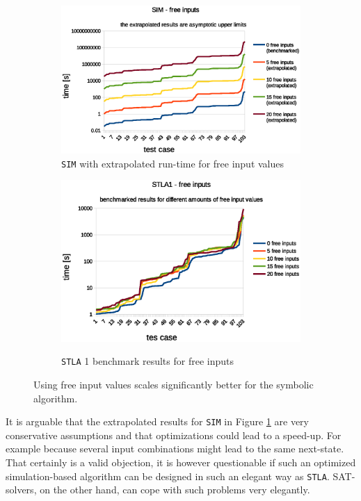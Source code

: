 \documentclass[a4paper,10pt]{article}
\begin{document}
\begin{figure}[!htb]
\centering
  \begin{subfigure}[b]{0.85\linewidth}  \centering
    \includegraphics[width=\linewidth]{img/sim_free_inputs.eps}
    \caption{\texttt{SIM} with extrapolated run-time for free input values}
    \label{free_inputs_sim}
  \end{subfigure}
  \begin{subfigure}[b]{0.85\linewidth}  \centering
    \includegraphics[width=\linewidth]{img/stla1_free_inputs.eps}
    \label{free_inputs_stla}
    \caption{\texttt{STLA} 1 benchmark results for free inputs}
  \end{subfigure}
  \caption{Using free input values scales significantly better for the symbolic algorithm. }
\label{fig_free_inputs}
\end{figure}

It is arguable that the extrapolated results for \texttt{SIM} in Figure \ref{free_inputs_sim} are very conservative assumptions and that optimizations could lead to a speed-up. For example because several input combinations
might lead to the same next-state. That certainly is a valid objection, it is however questionable if such an optimized simulation-based algorithm can be designed in such an elegant way as \texttt{STLA}. 
SAT-solvers, on the other hand, can cope with such problems very elegantly.
\end{document}
